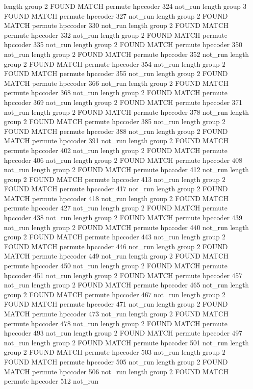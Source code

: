 length group  2
FOUND MATCH permute hpccoder 324 not_run
length group  3
FOUND MATCH permute hpccoder 327 not_run
length group  2
FOUND MATCH permute hpccoder 330 not_run
length group  2
FOUND MATCH permute hpccoder 332 not_run
length group  2
FOUND MATCH permute hpccoder 335 not_run
length group  2
FOUND MATCH permute hpccoder 350 not_run
length group  2
FOUND MATCH permute hpccoder 352 not_run
length group  2
FOUND MATCH permute hpccoder 354 not_run
length group  2
FOUND MATCH permute hpccoder 355 not_run
length group  2
FOUND MATCH permute hpccoder 366 not_run
length group  2
FOUND MATCH permute hpccoder 368 not_run
length group  2
FOUND MATCH permute hpccoder 369 not_run
length group  2
FOUND MATCH permute hpccoder 371 not_run
length group  2
FOUND MATCH permute hpccoder 378 not_run
length group  2
FOUND MATCH permute hpccoder 385 not_run
length group  2
FOUND MATCH permute hpccoder 388 not_run
length group  2
FOUND MATCH permute hpccoder 391 not_run
length group  2
FOUND MATCH permute hpccoder 402 not_run
length group  2
FOUND MATCH permute hpccoder 406 not_run
length group  2
FOUND MATCH permute hpccoder 408 not_run
length group  2
FOUND MATCH permute hpccoder 412 not_run
length group  2
FOUND MATCH permute hpccoder 413 not_run
length group  2
FOUND MATCH permute hpccoder 417 not_run
length group  2
FOUND MATCH permute hpccoder 418 not_run
length group  2
FOUND MATCH permute hpccoder 427 not_run
length group  2
FOUND MATCH permute hpccoder 438 not_run
length group  2
FOUND MATCH permute hpccoder 439 not_run
length group  2
FOUND MATCH permute hpccoder 440 not_run
length group  2
FOUND MATCH permute hpccoder 443 not_run
length group  2
FOUND MATCH permute hpccoder 446 not_run
length group  2
FOUND MATCH permute hpccoder 449 not_run
length group  2
FOUND MATCH permute hpccoder 450 not_run
length group  2
FOUND MATCH permute hpccoder 451 not_run
length group  2
FOUND MATCH permute hpccoder 457 not_run
length group  2
FOUND MATCH permute hpccoder 465 not_run
length group  2
FOUND MATCH permute hpccoder 467 not_run
length group  2
FOUND MATCH permute hpccoder 471 not_run
length group  2
FOUND MATCH permute hpccoder 473 not_run
length group  2
FOUND MATCH permute hpccoder 478 not_run
length group  2
FOUND MATCH permute hpccoder 493 not_run
length group  2
FOUND MATCH permute hpccoder 497 not_run
length group  2
FOUND MATCH permute hpccoder 501 not_run
length group  2
FOUND MATCH permute hpccoder 503 not_run
length group  2
FOUND MATCH permute hpccoder 505 not_run
length group  2
FOUND MATCH permute hpccoder 506 not_run
length group  2
FOUND MATCH permute hpccoder 512 not_run
